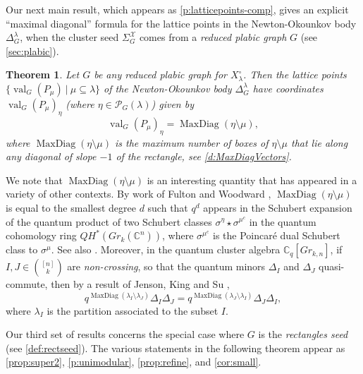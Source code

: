 \documentclass{amsart}
\newtheorem{mainthm}{Theorem}
\theoremstyle{definition}
\numberwithin{equation}{section}
\newcommand{\C}{\mathbb{C}}
\newcommand{\val}{{\operatorname{val}}}
\newcommand{\maxdiag}{{\operatorname{MaxDiag}}}
\begin{document}
Our next main result, which appears as \cref{p:latticepoints-comp}, gives
an explicit ``maximal diagonal'' formula for the lattice points in the Newton-Okounkov body
$\Delta^{\lambda}_G$, when the cluster seed
 $\Sigma_G^{\mathcal{X}}$ comes from a \emph{reduced plabic graph}  $G$
 (see \cref{sec:plabic}).
\begin{mainthm}\label{t:mainmaxdiag}
Let $G$ be any reduced plabic graph for $X_{\lambda}^{\circ}$.
Then the lattice points 
$\{\val_G(P_{\mu}) \ \vert \  \mu \subseteq \lambda\}$ of 
the Newton-Okounkov body
$\Delta^{\lambda}_{G}$ have coordinates 
	$\val_G(P_\mu)_\eta$ (where 
	$\eta\in\mathcal P_G(\lambda)$)
	given by 
\begin{equation}\label{e2:GenMaxDiag}
\val_G(P_\mu)_\eta=\maxdiag(\eta\setminus\mu),
\end{equation}
	where $\maxdiag(\eta\setminus\mu)$ is the maximum number of boxes of 
	$\eta \setminus \mu$ that lie along any diagonal of slope $-1$ of the rectangle, 
	see \cref{d:MaxDiagVectors}.
\end{mainthm} 
We note that $\maxdiag(\eta\setminus\mu)$ is an interesting quantity that
has appeared in a variety of other contexts.  
By work of Fulton and Woodward \cite{FW}, 
$\maxdiag (\eta \setminus \mu)$ is equal to the
smallest degree $d$ such that $q^d$ appears in the Schubert expansion of 
the quantum product of two Schubert
classes $\sigma^{\eta}\star \sigma^{\mu^c}
$ in the quantum cohomology ring  $QH^*(Gr_k(\C^n))$, 
where $\sigma^{\mu^c}$ is the Poincar\'e dual Schubert class to $\sigma^\mu$.
See also \cite{Yong, PostnikovDuke}. 
Moreover, in the quantum cluster algebra $\C_q[Gr_{k,n}]$, if $I,J\in {[n] \choose k}$ are
\emph{non-crossing}, so that the quantum minors $\Delta_I$ and $\Delta_J$ quasi-commute,
then by a result of Jenson, King and Su \cite[Lemma 7.1 and Theorem 6.5]{JKS1},
\begin{equation}
	q^{\maxdiag(\lambda_I\setminus \lambda_J)} \Delta_I \Delta_J = 
	q^{\maxdiag(\lambda_J\setminus \lambda_I)} \Delta_J \Delta_I,
\end{equation}
where $\lambda_I$ is the partition associated to the subset $I$.

Our third set of results concerns the special case where $G$ is the \emph{rectangles seed}
(see \cref{def:rectseed}).  
The various statements in the following theorem appear as 
\cref{prop:super2}, \cref{p:unimodular},
\cref{prop:refine}, and \cref{cor:small}.
\end{document}
